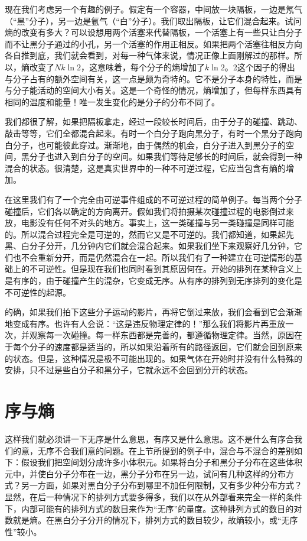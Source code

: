 现在我们考虑另一个有趣的例子。假定有一个容器，中间放一块隔板，一边是氖气（“黑”分子），另一边是氩气（“白”分子）。我们取出隔板，让它们混合起来。试问熵的改变有多大？可以设想用两个活塞来代替隔板，一个活塞上有一些只让白分子而不让黑分子通过的小孔，另一个活塞的作用正相反。如果把两个活塞往相反方向各自推到底，我们就会看到，对每一种气体来说，情况正像上面刚解过的那样。所以，熵改变了$Nk \ln 2$，这意味着，每个分子的熵增加了$k \ln 2$。2这个因子的得出与分子占有的额外空间有关，这一点是颇为奇特的。它不是分子本身的特性，而是与分子能活动的空间大小有关。这是一个奇怪的情况，熵增加了，但每样东西具有相同的温度和能量！唯一发生变化的是分子的分布不同了。

我们都很了解，如果把隔板拿走，经过一段较长时间后，由于分子的碰撞、跳动、敲击等等，它们全都混合起来。有时一个白分子跑向黑分子，有时一个黑分子跑向白分子，也可能彼此穿过。渐渐地，由于偶然的机会，白分子进入到黑分子的空间，黑分子也进入到白分子的空间。如果我们等待足够长的时间后，就会得到一种混合的状态。很清楚，这是真实世界中的一种不可逆过程，它应当包含有熵的增加。

在这里我们有了一个完全由可逆事件组成的不可逆过程的简单例子。每当两个分子碰撞后，它们各以确定的方向离开。假如我们将拍摄某次碰撞过程的电影倒过来放，电影没有任何不对头的地方。事实上，这一类碰撞与另一类碰撞是同样可能的。所以混合过程完全是可逆的，然而它又是不可逆的。我们都知道，如果起先黑、白分子分开，几分钟内它们就会混合起来。如果我们坐下来观察好几分钟，它们也不会重新分开，而是仍然混合在一起。所以我们有了一种建立在可逆情形的基础上的不可逆性。但是现在我们也同时看到其原因何在。开始的排列在某种含义上是有序的，由于碰撞产生的混杂，它变成无序。从有序的排列到无序排列的变化是不可逆性的起源。

的确，如果我们拍下这些分子运动的影片，再将它倒过来放，我们会看到它会渐渐地变成有序。也许有人会说：“这是违反物理定律的！”那么我们将影片再重放一次，并观察每一次碰撞。每一样东西都是完善的，都遵循物理定律。当然，原因在于每个分子的速度都是适当的，所以如果沿着所有的路径返回，它们就会回到原来的状态。但是，这种情况是极不可能出现的。如果气体在开始时并没有什么特殊的安排，只不过是些白分子和黑分子，它就永远不会回到分开的状态。

\section{序与熵}

这样我们就必须讲一下无序是什么意思，有序又是什么意思。这不是什么有序合我们的意，无序不合我们意的问题。在上节所提到的例子中，混合与不混合的差别如下：假设我们把空间划分成许多小体积元。如果将白分子和黑分子分布在这些体积元中，并使白分子分布在一边，黑分子分布在另一边，试问有几种这样的分布方式？另一方面，如果对黑白分子分布到哪里不加任何限制，又有多少种分布方式？显然，在后一种情况下的排列方式要多得多，我们以在从外部看来完全一样的条件下，内部可能有的排列方式的数目来作为“无序”的量度。这种排列方式的数目的对数就是熵。在黑白分子分开的情况下，排列方式的数目较少，故熵较小，或“无序性”较小。

